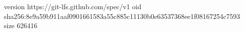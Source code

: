 version https://git-lfs.github.com/spec/v1
oid sha256:8e9a59b911aaf0901661583a55c885c11130b0e63537368ee1f08167254c7593
size 626416
